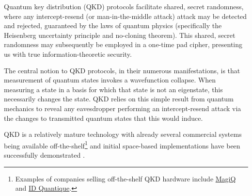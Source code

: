 

Quantum key distribution (QKD) protocols facilitate shared, secret randomness, where any intercept-resend (or man-in-the-middle attack) attack may be detected and rejected, guaranteed by the laws of quantum physics (specifically the Heisenberg uncertainty principle and no-cloning theorem). This shared, secret randomness may subsequently be employed in a one-time pad cipher, presenting us with true information-theoretic security.

The central notion to QKD protocols, in their numerous manifestations, is that measurement of quantum states invokes a wavefunction collapse. When measuring a state in a basis for which that state is not an eigenstate, this necessarily changes the state. QKD relies on this simple result from quantum mechanics to reveal any eavesdropper performing an intercept-resend attack via the changes to transmitted quantum states that this would induce.

QKD is a relatively mature technology with already several commercial systems being available off-the-shelf\footnote{Examples of companies selling off-the-shelf QKD hardware include \href{http://www.magiqtech.com}{MagiQ} and \href{http://www.idquantique.com}{ID Quantique}.} and initial space-based implementations have been successfully demonstrated \cite{Pan}.

